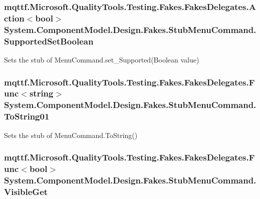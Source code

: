 \hypertarget{class_system_1_1_component_model_1_1_design_1_1_fakes_1_1_stub_menu_command_ac9347735ca1e6a9954e8291702340480}{
\subsubsection[{Supported\-Set\-Boolean}]{\setlength{\rightskip}{0pt plus 5cm}mqttf.\-Microsoft.\-Quality\-Tools.\-Testing.\-Fakes.\-Fakes\-Delegates.\-Action$<$bool$>$ System.\-Component\-Model.\-Design.\-Fakes.\-Stub\-Menu\-Command.\-Supported\-Set\-Boolean}}\label{class_system_1_1_component_model_1_1_design_1_1_fakes_1_1_stub_menu_command_ac9347735ca1e6a9954e8291702340480}


Sets the stub of Menu\-Command.\-set\-\_\-\-Supported(\-Boolean value)

\hypertarget{class_system_1_1_component_model_1_1_design_1_1_fakes_1_1_stub_menu_command_a4224dc6328dbd5e281752a9c8bf7e329}{
\subsubsection[{To\-String01}]{\setlength{\rightskip}{0pt plus 5cm}mqttf.\-Microsoft.\-Quality\-Tools.\-Testing.\-Fakes.\-Fakes\-Delegates.\-Func$<$string$>$ System.\-Component\-Model.\-Design.\-Fakes.\-Stub\-Menu\-Command.\-To\-String01}}\label{class_system_1_1_component_model_1_1_design_1_1_fakes_1_1_stub_menu_command_a4224dc6328dbd5e281752a9c8bf7e329}


Sets the stub of Menu\-Command.\-To\-String()

\hypertarget{class_system_1_1_component_model_1_1_design_1_1_fakes_1_1_stub_menu_command_a8c701ed5addc825ffcfea5eef75f3e91}{
\subsubsection[{Visible\-Get}]{\setlength{\rightskip}{0pt plus 5cm}mqttf.\-Microsoft.\-Quality\-Tools.\-Testing.\-Fakes.\-Fakes\-Delegates.\-Func$<$bool$>$ System.\-Component\-Model.\-Design.\-Fakes.\-Stub\-Menu\-Command.\-Visible\-Get}}\label{class_system_1_1_component_model_1_1_design_1_1_fakes_1_1_stub_menu_command_a8c701ed5addc825ffcfea5eef75f3e91}



